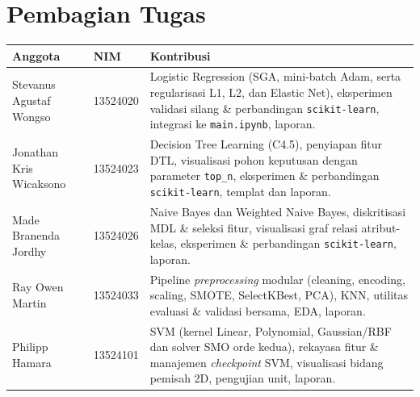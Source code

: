 \section{Pembagian Tugas}

\begingroup
\renewcommand{\arraystretch}{1.45}
\noindent\begin{tabularx}{\textwidth}{@{}llX@{}}
  \toprule
  \textbf{Anggota} & \textbf{NIM} & \textbf{Kontribusi} \\
  \midrule
  Stevanus Agustaf Wongso & 13524020 & Logistic Regression (SGA, mini-batch Adam, serta regularisasi L1, L2, dan Elastic Net), eksperimen validasi silang \& perbandingan \texttt{scikit-learn}, integrasi ke \texttt{main.ipynb}, laporan. \\
  Jonathan Kris Wicaksono & 13524023 & Decision Tree Learning (C4.5), penyiapan fitur DTL, visualisasi pohon keputusan dengan parameter \texttt{top\_n}, eksperimen \& perbandingan \texttt{scikit-learn}, templat dan laporan. \\
  Made Branenda Jordhy & 13524026 & Naive Bayes dan Weighted Naive Bayes, diskritisasi MDL \& seleksi fitur, visualisasi graf relasi atribut-kelas, eksperimen \& perbandingan \texttt{scikit-learn}, laporan. \\
  Ray Owen Martin & 13524033 & Pipeline \textit{preprocessing} modular (cleaning, encoding, scaling, SMOTE, SelectKBest, PCA), KNN, utilitas evaluasi \& validasi bersama, EDA, laporan. \\
  Philipp Hamara & 13524101 & SVM (kernel Linear, Polynomial, Gaussian/RBF dan solver SMO orde kedua), rekayasa fitur \& manajemen \textit{checkpoint} SVM, visualisasi bidang pemisah 2D, pengujian unit, laporan. \\
  \bottomrule
\end{tabularx}
\endgroup

